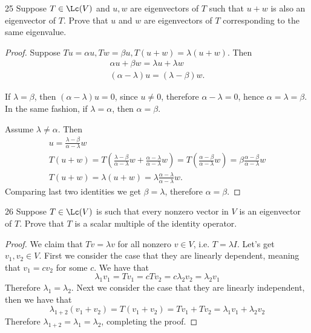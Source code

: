 \documentclass{extarticle}
\begin{document}
\begin{problem}{25}
    Suppose \(T \in \Lc(V)\) and \(u, w\) are eigenvectors of \(T\) such that 
    \(u + w\) is also an eigenvector of \(T\). Prove that \(u\) and \(w\) are eigenvectors 
    of \(T\) corresponding to the same eigenvalue.  
\end{problem}

\begin{proof}
    Suppose $ Tu = \alpha u, Tw = \beta u, T(u+w) = \lambda(u + w) $. Then
    \begin{gather*}
        \alpha u + \beta w = \lambda u + \lambda w \\ 
        (\alpha - \lambda) u = (\lambda - \beta) w.
    \end{gather*}

    If $ \lambda = \beta $, then $ (\alpha - \lambda) u = 0 $, since
    $ u \ne 0 $, therefore $ \alpha - \lambda = 0 $, hence $ \alpha = \lambda = \beta $.
    In the same fashion, if $ \lambda = \alpha $, then $ \alpha = \beta $.

    Assume $ \lambda \ne \alpha $. Then 
    \begin{gather*}
        u = \frac{\lambda - \beta}{\alpha - \lambda} w \\ 
        T(u+w) = T(\frac{\lambda - \beta}{\alpha - \lambda} w +
        \frac{\alpha - \lambda}{\alpha - \lambda} w) =
        T(\frac{\alpha - \beta}{\alpha - \lambda} w) =
        \beta \frac{\alpha - \beta}{\alpha - \lambda} w \\ 
        T(u+w) =  \lambda(u + w) = \lambda \frac{\alpha - \lambda}{\alpha - \lambda} w.
    \end{gather*}
    Comparing last two identities we get $ \beta = \lambda $, therefore $ \alpha = \beta $.
%
%
\end{proof}

\begin{problem}{26}
    Suppose \(T \in \Lc(V)\) is such that every nonzero vector in \(V\) is an eigenvector of 
    \(T\). Prove that \(T\) is a scalar multiple of the identity operator. 
\end{problem}

\begin{proof}
We claim that \(Tv = \lambda v\) for all nonzero \(v \in V\), i.e. \(T = \lambda I\). Let's 
get \(v_1, v_2 \in V\). First we consider the case that they are linearly dependent, meaning 
that \(v_1 = c v_2\) for some \(c\). We have that 
\[\lambda_1 v_1 = Tv_1 = c Tv_2 = c \lambda_2 v_2 = \lambda_2 v_1\]
Therefore \(\lambda_1 = \lambda_2\). Next we consider the case that they are linearly independent, 
then we have that 
\[ \lambda_{1+2} (v_1 + v_2) = T (v_1 + v_2) = Tv_1 + Tv_2 = \lambda_1 v_1 + \lambda_2 v_2 \]
Therefore \(\lambda_{1+2} = \lambda_1  = \lambda_2\), completing the proof. 
\end{proof}
\end{document}
